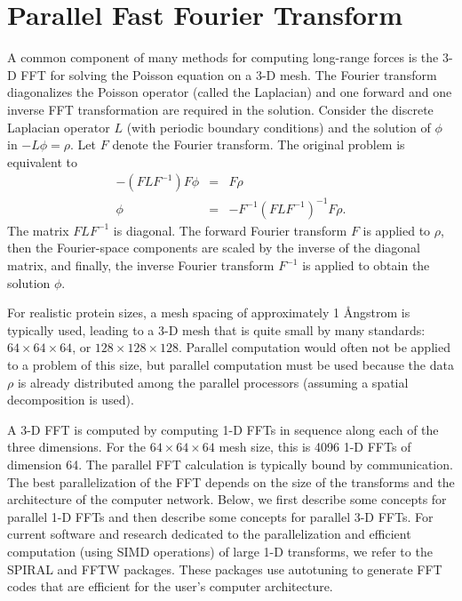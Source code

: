 \section{Parallel Fast Fourier Transform}
\label{sec:fft}

A common component of many methods for computing long-range forces
is the 3-D FFT for solving the Poisson equation on a 3-D mesh.
The Fourier transform diagonalizes the Poisson operator (called 
the Laplacian) and one
forward and one inverse FFT transformation are required in 
the solution.  Consider the discrete Laplacian operator $L$
(with periodic boundary conditions)
and the solution of $\phi$ in $-L \phi = \rho$.  Let $F$ denote
the Fourier transform.  The original problem is equivalent to
\begin{eqnarray*}
 - (F L F^{-1}) F \phi & = &  F \rho \\
 \phi & = & - F^{-1} (F L F^{-1})^{-1} F \rho .
\end{eqnarray*}
The matrix $F L F^{-1}$ is diagonal.  The forward Fourier transform
$F$ is applied to $\rho$, then the Fourier-space components are scaled
by the inverse of the diagonal matrix, and finally, the inverse
Fourier transform $F^{-1}$ is applied to obtain the solution $\phi$.

For realistic protein sizes, a mesh spacing of approximately 1 {\AA}ngstrom
is typically used, leading to a 3-D mesh that is quite small by many
standards:  $64 \times 64 \times 64$, or $128 \times 128 \times 128$.  
Parallel computation would often
not be applied to a problem of this size, but parallel computation must
be used because the data $\rho$ is already distributed among the parallel
processors (assuming a spatial decomposition is used).

A 3-D FFT is computed by computing 1-D FFTs in sequence along each of the
three dimensions.  For the $64 \times 64 \times 64$ mesh size, this is 4096 1-D
FFTs of dimension 64.  The parallel FFT calculation is typically bound
by communication.  The best parallelization of the FFT depends on the
size of the transforms and the architecture of the computer network.
Below, we first describe some concepts for parallel 1-D FFTs and then
describe some concepts for parallel 3-D FFTs.  For current software and
research dedicated to the parallelization and efficient computation
(using SIMD operations)
of large 1-D transforms, we refer to the SPIRAL and FFTW packages.
These packages use autotuning to generate FFT codes that are efficient
for the user's computer architecture.

